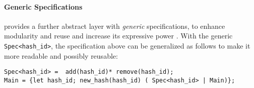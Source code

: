 
\paragraph{Generic Specifications}
\rml provides a further abstract layer with \emph{generic} specifications,
to enhance modularity and reuse and increase its expressive power \cite{RML2021}.
With the generic \lstinline{Spec<hash_id>}, the specification above
can be generalized as follows to make it more readable and possibly reusable:
\begin{lstlisting}[basicstyle=\ttfamily\scriptsize]
Spec<hash_id> =  add(hash_id)* remove(hash_id); 
Main = {let hash_id; new_hash(hash_id) ( Spec<hash_id> | Main)};
\end{lstlisting}

